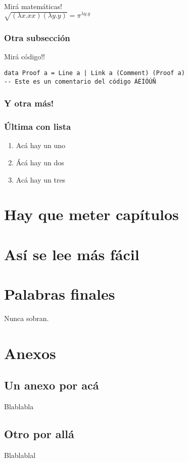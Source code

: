 \documentclass[12pt,a4paper,oneside]{book}
\begin{document}
Mirá matemáticas!
\\

$\sqrt{(\lambda x . x x)(\lambda y . y)} = \pi^{\lambda y . y}$

\subsection{Otra subsección}

Mirá código!!

\begin{lstlisting}
data Proof a = Line a | Link a (Comment) (Proof a)
-- Este es un comentario del código ÁÉÍÓÚÑ
\end{lstlisting}\bigskip

\subsection{Y otra más!}

\subsection{Última con lista}

\begin{enumerate}
\item Acá hay un uno
\item Ácá hay un dos
\item Acá hay un tres
\end{enumerate}


\chapter{Hay que meter capítulos}

\chapter{Así se lee más fácil}

\chapter{Palabras finales}

Nunca sobran.




\chapter{Anexos}
\section{Un anexo por acá}

Blablabla

\section{Otro por allá}

Blablablal
\end{document}
